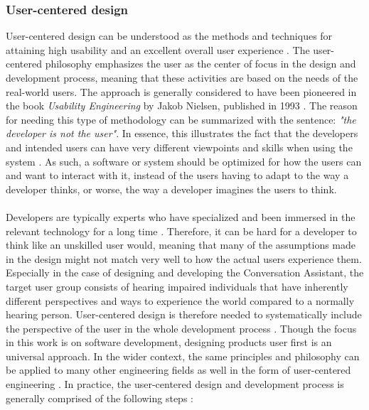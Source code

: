 \documentclass[english, 12pt, a4paper, pdftex, elec, utf8]{aaltothesis}
\begin{document}
\subsubsection{User-centered design} \label{sec:user}

User-centered design can be understood as the methods and techniques for attaining high usability and an excellent overall user experience \cite{richter2014user, deuff2013user}. The user-centered philosophy emphasizes the user as the center of focus in the design and development process, meaning that these activities are based on the needs of the real-world users. The approach is generally considered to have been pioneered in the book \textit{Usability Engineering} by Jakob Nielsen, published in 1993 \cite{richter2014user, nielsen1993usability}. The reason for needing this type of methodology can be summarized with the sentence: \textit{"the developer is not the user"}. In essence, this illustrates the fact that the developers and intended users can have very different viewpoints and skills when using the system \cite{richter2014user, deuff2013user}. As such, a software or system should be optimized for how the users can and want to interact with it, instead of the users having to adapt to the way a developer thinks, or worse, the way a developer imagines the users to think. \\\\
Developers are typically experts who have specialized and been immersed in the relevant technology for a long time \cite[p.~2]{richter2014user}. Therefore, it can be hard for a developer to think like an unskilled user would, meaning that many of the assumptions made in the design might not match very well to how the actual users experience them. Especially in the case of designing and developing the Conversation Assistant, the target user group consists of hearing impaired individuals that have inherently different perspectives and ways to experience the world compared to a normally hearing person. User-centered design is therefore needed to systematically include the perspective of the user in the whole development process \cite{richter2014user, deuff2013user, nielsen1993usability}. Though the focus in this work is on software development, designing products user first is an universal approach. In the wider context, the same principles and philosophy can be applied to many other engineering fields as well in the form of user-centered engineering \cite{richter2014user}. In practice, the user-centered design and development process is generally comprised of the following steps \cite[p.~11--16]{richter2014user}:
\end{document}
